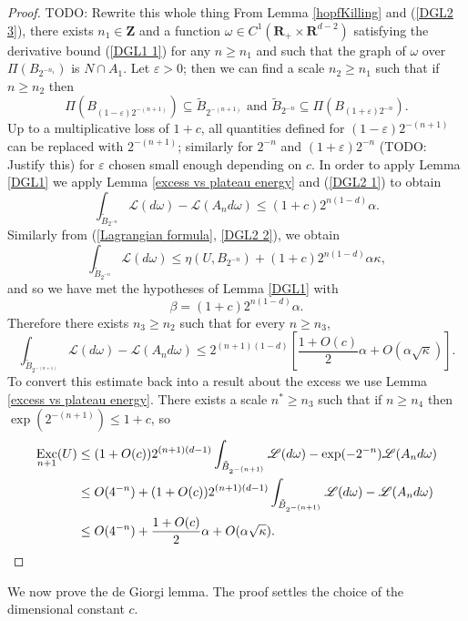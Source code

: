 \documentclass[reqno,12pt,letterpaper]{amsart}
\newcommand{\ZZ}{\mathbf{Z}}
\newcommand{\RR}{\mathbf{R}}
\DeclareMathOperator{\Exc}{Exc}
\newcommand{\Lagrange}{\mathscr L}
\theoremstyle{definition}
\numberwithin{equation}{section}
\begin{document}
\begin{proof}
TODO: Rewrite this whole thing
From Lemma \ref{hopfKilling} and (\ref{DGL2 3}), there exists $n_1 \in \ZZ$ and a function $\omega \in C^1(\RR_+ \times \RR^{d - 2})$ satisfying the derivative bound (\ref{DGL1 1}) for any $n \geq n_1$
and such that the graph of $\omega$ over $\Pi(B_{2^{-n_1}})$ is $N \cap A_1$.
Let $\varepsilon > 0$; then we can find a scale $n_2 \geq n_1$ such that if $n \geq n_2$ then
$$\Pi(B_{(1 - \varepsilon) 2^{-(n+1)}}) \subseteq \tilde B_{2^{-(n+1)}} \text{ and } \tilde B_{2^{-n}} \subseteq \Pi(B_{(1 + \varepsilon) 2^{-n}}).$$
Up to a multiplicative loss of $1 + c$, all quantities defined for $(1 - \varepsilon)2^{-(n + 1)}$ can be replaced with $2^{-(n + 1)}$; similarly for $2^{-n}$ and $(1 + \varepsilon) 2^{-n}$ (TODO: Justify this) for $\varepsilon$ chosen small enough depending on $c$.
In order to apply Lemma \ref{DGL1} we apply Lemma \ref{excess vs plateau energy} and (\ref{DGL2 1}) to obtain
$$\int_{\tilde B_{2^{-n}}} \Lagrange(d\omega) - \Lagrange(A_n d\omega) \leq (1 + c)2^{n(1 - d)}\alpha.$$
Similarly from (\ref{Lagrangian formula}, \ref{DGL2 2}), we obtain
$$\int_{\tilde B_{2^{-n}}} \Lagrange(d\omega) \leq \eta(U, B_{2^{-n}}) + (1 + c) 2^{n(1-d)}\alpha \kappa,$$
and so we have met the hypotheses of Lemma \ref{DGL1} with
$$\beta = (1 + c)2^{n(1 - d)}\alpha.$$
Therefore there exists $n_3 \geq n_2$ such that for every $n \geq n_3$,
$$\int_{\tilde B_{2^{-(n+1)}}} \Lagrange(d\omega) - \Lagrange(A_nd\omega) \leq 2^{(n + 1)(1-d)}\left[ \frac{1 + O(c)}{2} \alpha + O(\alpha \sqrt \kappa)\right].$$
To convert this estimate back into a result about the excess we use Lemma \ref{excess vs plateau energy}.
There exists a scale $n^* \geq n_3$ such that if $n \geq n_4$ then $\exp(2^{-(n + 1)}) \leq 1 + c$, so
\begin{align*}
\Exc_{n + 1}(U) &\leq (1 + O(c)) 2^{(n+1)(d-1)} \int_{\tilde B_{2^{-(n+1)}}} \Lagrange(d\omega) - \exp(-2^{-n}) \Lagrange(A_nd\omega)\\
&\leq O(4^{-n}) + (1 + O(c)) 2^{(n+1)(d-1)} \int_{\tilde B_{2^{-(n+1)}}} \Lagrange(d\omega) - \Lagrange(A_nd\omega)\\
&\leq O(4^{-n}) + \frac{1 + O(c)}{2} \alpha + O(\alpha \sqrt \kappa). \qedhere
\end{align*}
\end{proof}

We now prove the de Giorgi lemma.
The proof settles the choice of the dimensional constant $c$.
\end{document}

